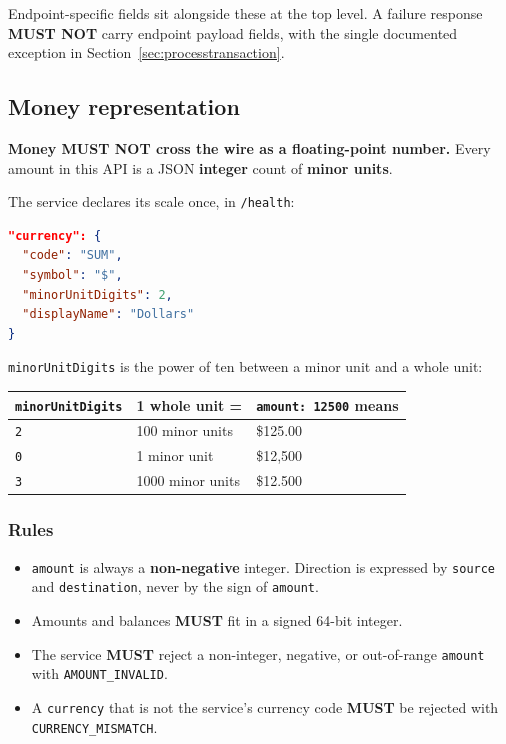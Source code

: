 \documentclass[11pt,a4paper]{article}
\newcommand{\code}[1]{\texttt{\small #1}}
\newcommand{\req}{\textbf{MUST}}
\newcommand{\keybox}[2]{%
  \par\vspace{0.5em}\noindent
  \colorbox{#1}{%
    \begin{minipage}{\dimexpr\linewidth-2\fboxsep\relax}
    \vspace{0.35em}\small #2\vspace{0.35em}
    \end{minipage}}%
  \par\vspace{0.5em}}
\newcommand{\warn}[1]{\keybox{omceWarnWash}{#1}}
\begin{document}
Endpoint-specific fields sit alongside these at the top level. A failure response \textbf{MUST NOT}
carry endpoint payload fields, with the single documented exception in
Section~\ref{sec:processtransaction}.

\subsection{Money representation}
\label{sec:money}

\warn{\textbf{Money MUST NOT cross the wire as a floating-point number.} Every amount in this API
is a JSON \textbf{integer} count of \textbf{minor units}.}

The service declares its scale once, in \code{/health}:

\begin{lstlisting}[language=json]
"currency": {
  "code": "SUM",
  "symbol": "$",
  "minorUnitDigits": 2,
  "displayName": "Dollars"
}
\end{lstlisting}

\code{minorUnitDigits} is the power of ten between a minor unit and a whole unit:

\begin{tabularx}{\linewidth}{L{3.6cm} L{4.2cm} X}
\toprule
\code{minorUnitDigits} & \textbf{1 whole unit =} & \code{amount: 12500} \textbf{means}\\
\midrule
\code{2} & 100 minor units  & \$125.00\\
\code{0} & 1 minor unit     & \$12,500\\
\code{3} & 1000 minor units & \$12.500\\
\bottomrule
\end{tabularx}

\subsubsection*{Rules}
\begin{itemize}
\item \code{amount} is always a \textbf{non-negative} integer. Direction is expressed by
      \code{source} and \code{destination}, never by the sign of \code{amount}.
\item Amounts and balances \req{} fit in a signed 64-bit integer.
\item The service \req{} reject a non-integer, negative, or out-of-range \code{amount} with
      \code{AMOUNT\_INVALID}.
\item A \code{currency} that is not the service's currency code \req{} be rejected with
      \code{CURRENCY\_MISMATCH}.
\end{itemize}
\end{document}
